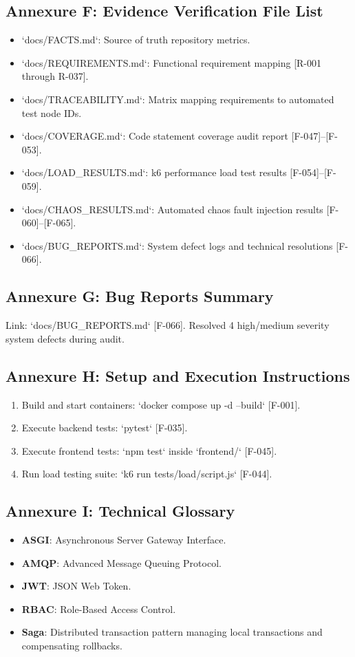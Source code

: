 \documentclass[11pt,a4paper]{article}
\begin{document}
\subsection{Annexure F: Evidence Verification File List}
\begin{itemize}
    \item `docs/FACTS.md`: Source of truth repository metrics.
    \item `docs/REQUIREMENTS.md`: Functional requirement mapping [R-001 through R-037].
    \item `docs/TRACEABILITY.md`: Matrix mapping requirements to automated test node IDs.
    \item `docs/COVERAGE.md`: Code statement coverage audit report [F-047]--[F-053].
    \item `docs/LOAD\_RESULTS.md`: k6 performance load test results [F-054]--[F-059].
    \item `docs/CHAOS\_RESULTS.md`: Automated chaos fault injection results [F-060]--[F-065].
    \item `docs/BUG\_REPORTS.md`: System defect logs and technical resolutions [F-066].
\end{itemize}

\subsection{Annexure G: Bug Reports Summary}
Link: `docs/BUG\_REPORTS.md` [F-066]. Resolved 4 high/medium severity system defects during audit.

\subsection{Annexure H: Setup and Execution Instructions}
\begin{enumerate}
    \item Build and start containers: `docker compose up -d --build` [F-001].
    \item Execute backend tests: `pytest` [F-035].
    \item Execute frontend tests: `npm test` inside `frontend/` [F-045].
    \item Run load testing suite: `k6 run tests/load/script.js` [F-044].
\end{enumerate}

\subsection{Annexure I: Technical Glossary}
\begin{itemize}
    \item \textbf{ASGI}: Asynchronous Server Gateway Interface.
    \item \textbf{AMQP}: Advanced Message Queuing Protocol.
    \item \textbf{JWT}: JSON Web Token.
    \item \textbf{RBAC}: Role-Based Access Control.
    \item \textbf{Saga}: Distributed transaction pattern managing local transactions and compensating rollbacks.
\end{itemize}
\end{document}
